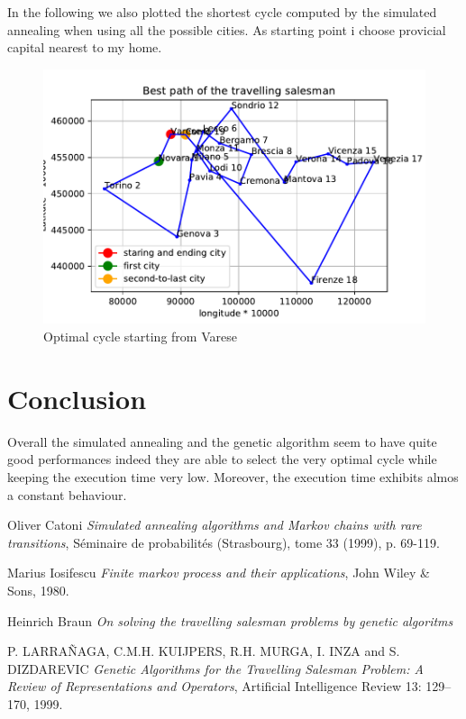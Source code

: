\documentclass{article}
\begin{document}
In the following we also plotted the shortest cycle computed by the simulated annealing when using all the possible cities. As starting point i choose provicial capital nearest to my home.
\begin{figure}[H]
\includegraphics[scale=1]{../path.pdf} 
\centering
\caption{Optimal cycle starting from Varese}
\end{figure}

\section{Conclusion}
Overall the simulated annealing and the genetic algorithm seem to have quite good performances indeed they are able to select the very optimal cycle while keeping the execution time very low. Moreover, the execution time exhibits almos a constant behaviour.

\begin{thebibliography}{9}

Oliver Catoni
\textit{Simulated annealing algorithms and Markov chains with rare transitions}, Séminaire de probabilités (Strasbourg), tome 33 (1999), p. 69-119.

Marius Iosifescu
\textit{Finite markov process and their applications}, John Wiley \& Sons, 1980.

Heinrich Braun
\textit{On solving the travelling salesman problems by genetic algoritms}

P. LARRAÑAGA, C.M.H. KUIJPERS, R.H. MURGA, I. INZA and S. DIZDAREVIC
\textit{Genetic Algorithms for the Travelling Salesman Problem: A Review of Representations and Operators}, Artificial Intelligence Review 13: 129–170, 1999.

 
\end{thebibliography}
\end{document}
